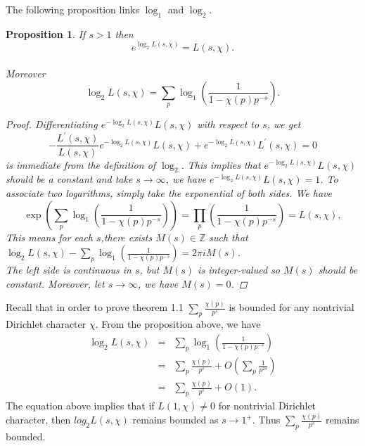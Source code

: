 \documentclass[psamsfonts]{amsart}
\newtheorem{prop}[thm]{Proposition}
\theoremstyle{definition}
\theoremstyle{remark}
\numberwithin{equation}{section}
\begin{document}
			The following proposition links $\log_1$ and $\log_2$.
			\begin{prop}
				If $s > 1$ then
				\begin{equation}
					e^{\log_2 L(s,\chi)} = L(s,\chi).
				\end{equation}\\
				Moreover 
				\begin{equation}
					\log_2 L(s,\chi) = \sum_{p} \log_1(\frac{1}{1-\chi(p)p^{-s}}).
				\end{equation}
									
				\begin{proof}
					Differentiating $e^{-\log_2 L(s,\chi)}L(s,\chi)$ with respect to $s$, we get
					\begin{equation}
					-\frac{L^{\prime}(s,\chi)}{L(s,\chi)}e^{-\log_2 L(s,\chi)}L(s,\chi) + e^{-\log_2 L(s,\chi)} L^{\prime}(s,\chi) = 0
					\end{equation}
					is immediate from the definition of $\log_2$.
					This implies that $e^{-\log_2 L(s,\chi)}L(s,\chi)$ should be a constant and take $s \rightarrow \infty$, we have $e^{-\log_2 L(s,\chi)}L(s,\chi) = 1$.
					To associate two logarithms, simply take the exponential of both sides. We have
					\begin{equation}
						\exp\left({\sum_{p} \log_1(\frac{1}{1-\chi(p)p^{-s}})}\right) = \prod_{p} \left(\frac{1}{1-\chi(p)p^{-s}}\right) = L(s,\chi),
					\end{equation}
					This means for each $s$,there exists $M(s) \in \mathbb{Z}$ such that $\log_2 L(s,\chi) - \sum_{p} \log_1(\frac{1}{1-\chi(p)p^{-s}}) = 2\pi iM(s)$.\\
					The left side is continuous in $s$, but $M(s)$ is integer-valued so $M(s)$ should be constant. Moreover, let $s \rightarrow \infty$, we have $M(s) = 0$.
				\end{proof}								
			\end{prop}
			Recall that in order to prove theorem 1.1 $\sum_{p} \frac{\chi(p)}{p^s}$ is bounded for any nontrivial Dirichlet character $\chi$. From the proposition above, we have
				\begin{eqnarray}
				\log_2L(s,\chi)	&=& \sum_p \log_1(\frac{1}{1-\chi(p)p^{-s}}) \nonumber \\
				&=& \sum_p \frac{\chi(p)}{p^s} + O(\sum_{p}\frac{1}{p^{2s}}) \nonumber \\
				&=& \sum_p \frac{\chi(p)}{p^s} + O(1).
				\end{eqnarray}
			The equation above implies that if $L(1,\chi) \neq 0$ for nontrivial Dirichlet character, then $log_2 L(s,\chi)$ remains bounded as $s \rightarrow 1^+$. Thus $\sum_{p} \frac{\chi(p)}{p^s}$ remains bounded.
		
\end{document}
